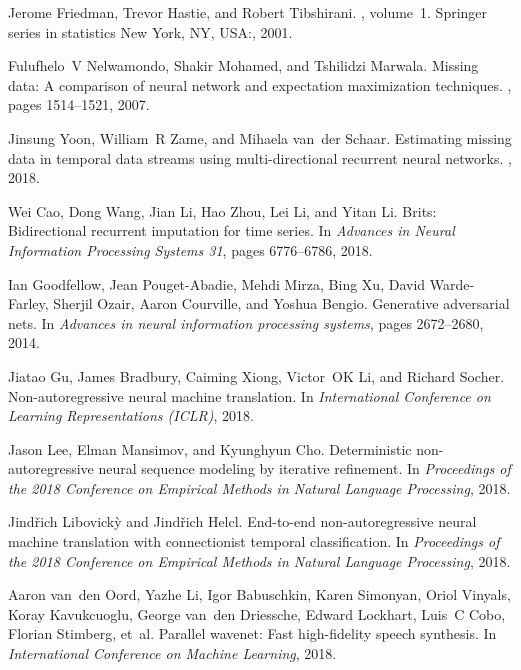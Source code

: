 \documentclass{article}
\begin{document}
\begin{thebibliography}{10}
Jerome Friedman, Trevor Hastie, and Robert Tibshirani.
, volume~1.
\newblock Springer series in statistics New York, NY, USA:, 2001.

Fulufhelo~V Nelwamondo, Shakir Mohamed, and Tshilidzi Marwala.
\newblock Missing data: A comparison of neural network and expectation
  maximization techniques.
, pages 1514--1521, 2007.

Jinsung Yoon, William~R Zame, and Mihaela van~der Schaar.
\newblock Estimating missing data in temporal data streams using
  multi-directional recurrent neural networks.
, 2018.

Wei Cao, Dong Wang, Jian Li, Hao Zhou, Lei Li, and Yitan Li.
\newblock Brits: Bidirectional recurrent imputation for time series.
\newblock In {\em Advances in Neural Information Processing Systems 31}, pages
  6776--6786, 2018.

Ian Goodfellow, Jean Pouget-Abadie, Mehdi Mirza, Bing Xu, David Warde-Farley,
  Sherjil Ozair, Aaron Courville, and Yoshua Bengio.
\newblock Generative adversarial nets.
\newblock In {\em Advances in neural information processing systems}, pages
  2672--2680, 2014.

Jiatao Gu, James Bradbury, Caiming Xiong, Victor~OK Li, and Richard Socher.
\newblock Non-autoregressive neural machine translation.
\newblock In {\em International Conference on Learning Representations (ICLR)},
  2018.

Jason Lee, Elman Mansimov, and Kyunghyun Cho.
\newblock Deterministic non-autoregressive neural sequence modeling by
  iterative refinement.
\newblock In {\em Proceedings of the 2018 Conference on Empirical Methods in
  Natural Language Processing}, 2018.

Jind{\v{r}}ich Libovick{\`y} and Jind{\v{r}}ich Helcl.
\newblock End-to-end non-autoregressive neural machine translation with
  connectionist temporal classification.
\newblock In {\em Proceedings of the 2018 Conference on Empirical Methods in
  Natural Language Processing}, 2018.

Aaron van~den Oord, Yazhe Li, Igor Babuschkin, Karen Simonyan, Oriol Vinyals,
  Koray Kavukcuoglu, George van~den Driessche, Edward Lockhart, Luis~C Cobo,
  Florian Stimberg, et~al.
\newblock Parallel wavenet: Fast high-fidelity speech synthesis.
\newblock In {\em International Conference on Machine Learning}, 2018.


\end{thebibliography}
\end{document}
